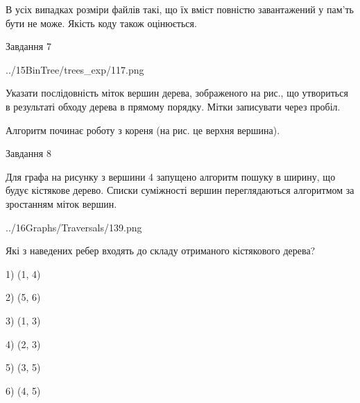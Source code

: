\documentclass[12pt, ukrainian]{article}
\begin{document}
{В усіх випадках розміри файлів такі, що їх вміст повністю завантажений у пам'ть бути не може. Якість коду також оцінюється.



\vspace{10mm}\par

\newpage
\begin{minipage}[t]{9.7cm}
               
{\begin{center}Завдання {7}\end{center}}
\vspace{-4mm}

\begin{center}
	{../15BinTree/trees_exp/117.png}
\end{center}
Указати послідовність міток вершин дерева, зображеного на рис., що утвориться в результаті обходу дерева в прямому порядку. Мітки записувати через пробіл.\par Алгоритм починає роботу з кореня (на рис. це верхня вершина).\par

\end{minipage}
\vline \hspace{8mm}
\begin{minipage}[t]{8.0cm}
               
{\begin{center}Завдання {8}\end{center}}
\vspace{-4mm}
Для графа на рисунку з вершини 4 запущено алгоритм пошуку в ширину, що будує кістякове дерево. Списки суміжності вершин переглядаються алгоритмом за зростанням міток вершин.\par
\begin{center}
	{../16Graphs/Traversals/139.png}
\end{center}
\par Які з наведених ребер входять до складу отриманого кістякового дерева?\par
1) (1, 4)\par
2) (5, 6)\par
3) (1, 3)\par
4) (2, 3)\par
5) (3, 5)\par
6) (4, 5)\par
{\vskip 15pt} \par


\end{minipage}}
\end{document}
